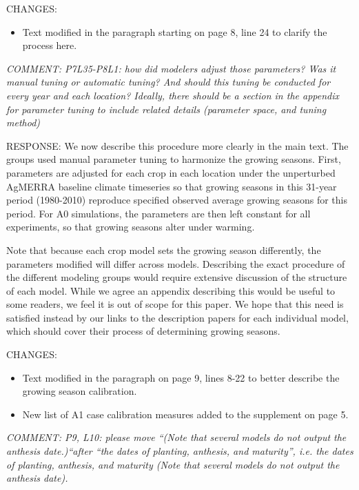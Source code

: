 \documentclass[gmd, manuscript]{copernicus} %
\begin{document}
CHANGES:
\begin{itemize}
    \item Text modified in the paragraph starting on page 8, line 24 to clarify the process here.
\end{itemize}

\smallskip

\textcolor{dark-gray}{\textit{COMMENT: P7L35-P8L1: how did modelers adjust those parameters? Was it manual tuning or automatic tuning? And should this tuning be conducted for every year and each location? Ideally, there should be a section in the appendix for parameter tuning to include related details (parameter space, and tuning method)}}

RESPONSE: We now describe this procedure more clearly in the main text. The groups used manual parameter tuning to harmonize the growing seasons. First, parameters are adjusted for each crop in each location under the unperturbed AgMERRA baseline climate timeseries so that growing seasons in this 31-year period (1980-2010) reproduce specified observed average growing seasons for this period. For A0 simulations, the parameters are then left constant for all experiments, so that growing seasons alter under warming. 

Note that because each crop model sets the growing season differently, the parameters modified will differ across models. Describing the exact procedure of the different modeling groups would require extensive discussion of the structure of each model. While we agree an appendix describing this would be useful to some readers, we feel it is out of scope for this paper. We hope that this need is satisfied instead by our links to the description papers for each individual model, which should cover their process of determining growing seasons.
\smallskip

CHANGES:
\begin{itemize}
    \item Text modified in the paragraph on page 9, lines 8-22 to better describe the growing season calibration.
    \item New list of A1 case calibration measures added to the supplement on page 5.
\end{itemize}

\smallskip

\textcolor{dark-gray}{\textit{COMMENT: P9, L10: please move “(Note that several models do not output the anthesis date.)“after “the dates of planting, anthesis, and maturity”, i.e. the dates of planting, anthesis, and maturity (Note that several models do not output the anthesis date).}}
\end{document}
